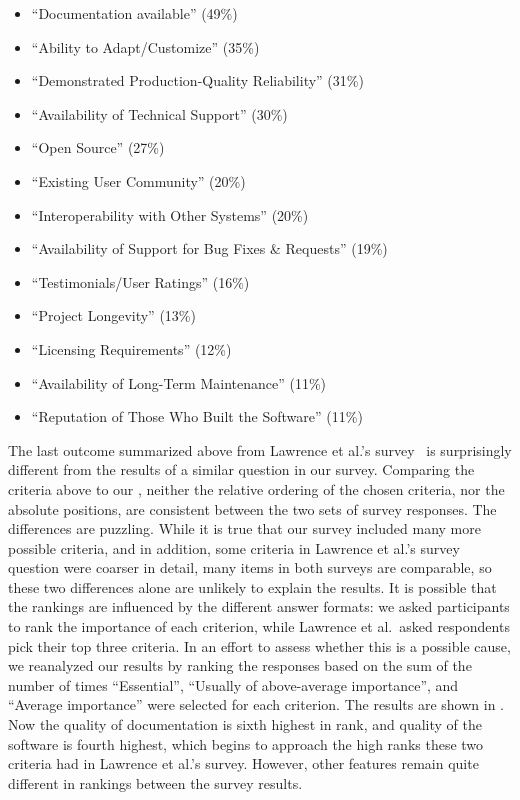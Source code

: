 \documentclass{casicswhitepaper}
\begin{document}
\begin{itemize}
\begin{itemize}[itemsep=0ex]
\item ``Documentation available'' (49\%)
\item ``Ability to Adapt/Customize'' (35\%)
\item ``Demonstrated Production-Quality Reliability'' (31\%)
\item ``Availability of Technical Support'' (30\%)
\item ``Open Source'' (27\%)
\item ``Existing User Community'' (20\%)
\item ``Interoperability with Other Systems'' (20\%)
\item ``Availability of Support for Bug Fixes \& Requests'' (19\%)
\item ``Testimonials/User Ratings'' (16\%)
\item ``Project Longevity'' (13\%)
\item ``Licensing Requirements'' (12\%)
\item ``Availability of Long-Term Maintenance'' (11\%)
\item ``Reputation of Those Who Built the Software'' (11\%)
\end{itemize}

\end{itemize}

The last outcome summarized above from Lawrence et al.'s survey~\cite{lawrence2015science} is surprisingly different from the results of a similar question in our survey.  Comparing the criteria above to our , neither the relative ordering of the chosen criteria, nor the absolute positions, are consistent between the two sets of survey responses.  The differences are puzzling.  While it is true that our survey included many more possible criteria, and in addition, some criteria in Lawrence et al.'s survey question were coarser in detail, many items in both surveys are comparable, so these two differences alone are unlikely to explain the results.  It is possible that the rankings are influenced by the different answer formats: we asked participants to rank the importance of each criterion, while Lawrence et al.\ asked respondents pick their top three criteria.  In an effort to assess whether this is a possible cause, we reanalyzed our results by ranking the responses based on the sum of the number of times ``Essential'', ``Usually of above-average importance'', and ``Average importance'' were selected for each criterion.  The results are shown in .  Now the quality of documentation is sixth highest in rank, and quality of the software is fourth highest, which begins to approach the high ranks these two criteria had in Lawrence et al.'s survey.  However, other features remain quite different in rankings between the survey results.
\end{document}
